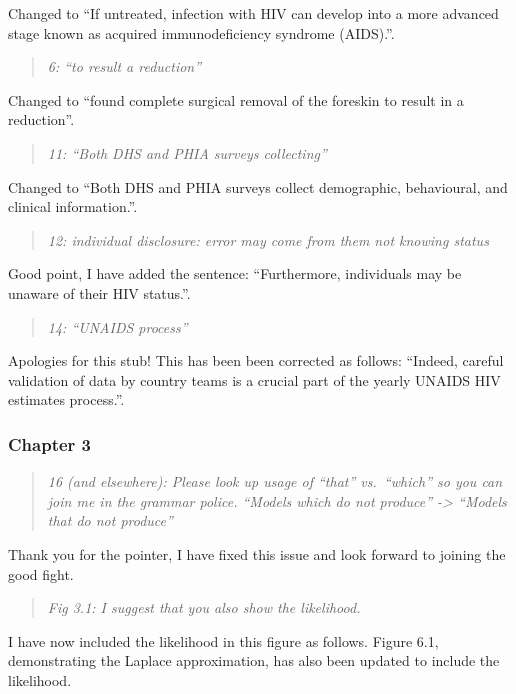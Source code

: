\documentclass[
  12pt,
]{article}
\begin{document}
Changed to ``If untreated, infection with HIV can develop into a more
advanced stage known as acquired immunodeficiency syndrome (AIDS).''.

\begin{quote}
\emph{6: ``to result a reduction''}
\end{quote}

Changed to ``found complete surgical removal of the foreskin to result
in a reduction''.

\begin{quote}
\emph{11: ``Both DHS and PHIA surveys collecting''}
\end{quote}

Changed to ``Both DHS and PHIA surveys collect demographic, behavioural,
and clinical information.''.

\begin{quote}
\emph{12: individual disclosure: error may come from them not knowing
status}
\end{quote}

Good point, I have added the sentence: ``Furthermore, individuals may be
unaware of their HIV status.''.

\begin{quote}
\emph{14: ``UNAIDS process''}
\end{quote}

Apologies for this stub! This has been been corrected as follows:
``Indeed, careful validation of data by country teams is a crucial part
of the yearly UNAIDS HIV estimates process.''.

\subsubsection{Chapter 3}\label{chapter-3}

\begin{quote}
\emph{16 (and elsewhere): Please look up usage of ``that'' vs.~``which''
so you can join me in the grammar police. ``Models which do not
produce'' -\textgreater{} ``Models that do not produce''}
\end{quote}

Thank you for the pointer, I have fixed this issue and look forward to
joining the good fight.

\begin{quote}
\emph{Fig 3.1: I suggest that you also show the likelihood.}
\end{quote}

I have now included the likelihood in this figure as follows. Figure
6.1, demonstrating the Laplace approximation, has also been updated to
include the likelihood.
\end{document}
